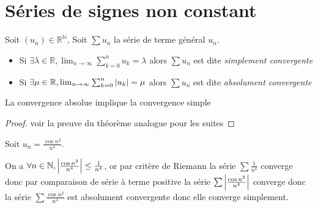 \documentclass[11pt,colorlinks]{book}
\theoremstyle{mytheoremstyle}
\theoremstyle{mytheoremstyle}
\theoremstyle{mytheoremstyle}
\theoremstyle{mytheoremstyle}
\theoremstyle{mytheoremstyle}
\theoremstyle{mytheoremstyle}
\theoremstyle{mytheoremstyle}
\theoremstyle{mytheoremstyle}
\theoremstyle{myproblemstyle}
\def\mbb#1{\mathbb{#1}}
\def\bN{\mbb{N}}
\def\bR{\mbb{R}}
\def\ln{\lim_{n \to \infty}}
\def\rN{\bR^{\bN}}
\begin{document}
\section{Séries de signes non constant}
\begin{definition}
  Soit $(u_n) \in \rN$, Soit $\sum u_n$ la série de terme général $u_n$.
  \begin{itemize}
    \item Si $\exists \lambda \in \bR, \ln \sum_{k=0}^n u_k = \lambda$ alors $\sum u_n$ est dite \textit{simplement convergente}
    \item Si $\exists \mu \in \bR, \ln \sum_{k=0}^n \abs{u_k} = \mu$ alors $\sum u_n$ est dite \textit{absolument convergente}
  \end{itemize}
\end{definition}
  \begin{theorem}
    La convergence absolue implique la convergence simple 
    \begin{proof}
      voir la preuve du théorème analogue pour les suites
    \end{proof}
  \end{theorem}
  \begin{ex}
    Soit $u_n = \frac{\cos n^2}{n^4}$.\newline 

    On a $\forall n \in \bN, \abs{\frac{\cos n^2}{n^4}} \leq \frac{1}{n^4}$, or par critère de Riemann la série $\sum \frac{1}{n^4}$ converge 
    donc par comparaison de série à terme positive la série $\sum \abs{\frac{\cos n^2}{n^4}}$ converge donc la série
    $\sum \frac{\cos n^2}{n^4}$ est absolument convergente donc elle converge simplement.
  \end{ex}
\end{document}
